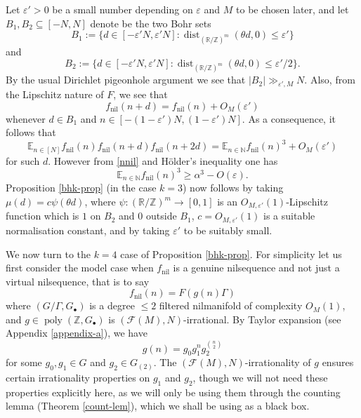 \documentclass[11pt,reqno]{amsart}
\numberwithin{equation}{section}
\theoremstyle{plain}
\theoremstyle{definition}
\renewcommand{\leq}{\leqslant}
\renewcommand{\geq}{\geqslant}
\newcommand\E{{\mathbb{E}}}
\newcommand\Z{\mathbb{Z}}
\newcommand\R{\mathbb{R}}
\newcommand\N{\mathbb{N}}
\newcommand\1{{\bf 1}}
\newcommand\2{{\bf 2}}
\newcommand\eps{\varepsilon}
\newcommand\poly{\operatorname{poly}}
\newcommand\nil{{\operatorname{nil}}}
\newcommand\dist{{\operatorname{dist}}}
\newcommand\Grow{{\mathcal F}}
\begin{document}
Let $\eps' > 0$ be a small number depending on $\eps$ and $M$ to be chosen later, and let $B_1, B_2 \subseteq [-N,N]$ denote be the two Bohr sets 
$$ B_1 := \{ d \in [-\eps' N,\eps' N]:  \dist_{(\R/\Z)^{m}}(\theta d,0) \leq \eps'\}$$
and
$$ B_2 := \{ d \in [-\eps' N, \eps' N] : \dist_{(\R/\Z)^m}(\theta d ,0) \leq \eps'/2\}.$$
By the usual Dirichlet pigeonhole argument we see that $|B_2| \gg_{\eps',M} N$.  Also, from the Lipschitz nature of  $F$, we see that
$$ f_\nil(n+d) = f_\nil(n) + O_M(\eps')$$
whenever $d \in B_1$ and $n \in [-(1-\eps')N, (1-\eps')N]$.  As a consequence, it follows that 
$$ \E_{n \in [N]} f_\nil(n) f_\nil(n+d) f_\nil(n+2d) = \E_{n \in \N} f_\nil(n)^3 + O_M(\eps')$$
for such $d$.  However from \eqref{nnil} and H\"older's inequality one has
$$ \E_{n \in \N} f_\nil(n)^3 \geq \alpha^3 - O(\eps).$$
Proposition \ref{bhk-prop} (in the case $k = 3$) now follows by taking $\mu(d) = c \psi(\theta d)$, where $\psi : (\R/\Z)^m \rightarrow [0,1]$ is an $O_{M,\eps'}(1)$-Lipschitz function which is $1$ on $B_2$ and $0$ outside $B_1$, $c = O_{M,\eps'}(1)$ is a suitable normalisation constant, and by taking $\eps'$ to be suitably small.

We now turn to the $k=4$ case of Proposition \ref{bhk-prop}.  For simplicity let us first consider the model case when $f_\nil$ is a genuine nilsequence and not just a virtual nilsequence, that is to say
\begin{equation}\label{fnil-form}
f_\nil(n) = F(g(n) \Gamma)
\end{equation}
where $(G/\Gamma,G_\bullet)$ is a degree $\leq 2$ filtered nilmanifold of complexity $O_M(1)$, and $g \in \poly(\Z,G_\bullet)$ is $(\Grow(M),N)$-irrational.  By Taylor expansion (see Appendix \ref{appendix-a}), we have
$$ g(n) = g_0 g_1^n g_2^{\binom{n}{2}}$$
for some $g_0, g_1 \in G$ and $g_2 \in G_{(2)}$.  The $(\Grow(M),N)$-irrationality of $g$ ensures certain irrationality properties on $g_1$ and $g_2$, though we will not need these properties explicitly here, as we will only be using them through the counting lemma (Theorem \ref{count-lem}), which we shall be using as a black box.
\end{document}
